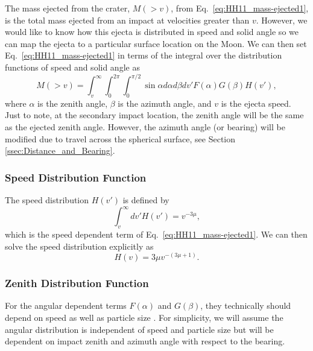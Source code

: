 \documentclass{hitec}
\begin{document}
The mass ejected from the crater, $M(>v)$, from Eq.\ \eqref{eq:HH11_mass-ejected1}, is the total mass ejected from an impact at velocities greater than $v$. However, we would like to know how this ejecta is distributed in speed and solid angle so we can map the ejecta to a particular surface location on the Moon. We can then set Eq.\ \eqref{eq:HH11_mass-ejected1} in terms of the integral over the distribution functions of speed and solid angle as
\begin{equation}
M(>v) = \int_{v}^{\infty}\int_{0}^{2\pi}\int_{0}^{\pi/2}\sin\alpha d\alpha d\beta dv' F(\alpha)G(\beta)H(v'),
\end{equation} 
where $\alpha$ is the zenith angle, $\beta$ is the azimuth angle, and $v$ is the ejecta speed. Just to note, at the secondary impact location, the zenith angle will be the same as the ejected zenith angle. However, the azimuth angle (or bearing) will be modified due to travel across the spherical surface, see Section \ref{ssec:Distance_and_Bearing}.

\subsubsection{Speed Distribution Function}

The speed distribution $H(v')$ is defined by
\begin{equation}
\int_{v}^{\infty}dv'H(v') = v^{-3\mu},
\end{equation}
which is the speed dependent term of Eq.\ \eqref{eq:HH11_mass-ejected1}. We can then solve the speed distribution explicitly as
\begin{equation}
H(v) = 3\mu v^{-(3\mu+1)}.
\end{equation}


\subsubsection{Zenith Distribution Function}



For the angular dependent terms $F(\alpha)$ and $G(\beta)$, they technically should depend on speed as well as particle size \citep[e.g.,][]{rival1999modeling}. For simplicity, we will assume the angular distribution is independent of speed and particle size but will be dependent on impact zenith and azimuth angle with respect to the bearing.
\end{document}
